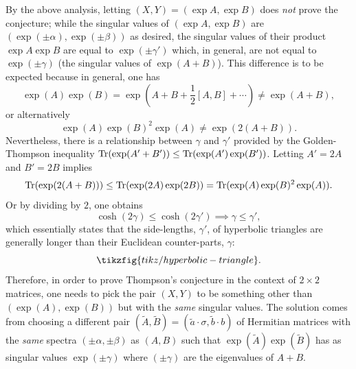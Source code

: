 \documentclass[notitlepage]{article}
\begin{document}
By the above analysis, letting $(X,Y) = (\exp A, \exp B)$ does \textit{not} prove the conjecture;
while the singular values of $(\exp A, \exp B)$ are $(\exp (\pm \alpha), \exp(\pm \beta))$ as desired, the singular values of their product $\exp A \exp B$ are equal to $\exp(\pm \gamma')$ which, in general, are not equal to $\exp(\pm \gamma)$ (the singular values of $\exp (A + B)$).
This difference is to be expected because in general, one has
\begin{equation}
    \exp(A)\exp(B) = \exp(A+B+\frac{1}{2}[A,B]+\cdots) \neq \exp(A+B),
\end{equation}
or alternatively
\begin{equation}
    \exp(A)\exp(B)^2\exp(A) \neq \exp(2(A+B)).
\end{equation}
Nevertheless, there is a relationship between $\gamma$ and $\gamma'$ provided by the Golden-Thompson inequality $\operatorname{Tr}(\exp(A'+B')) \leq \operatorname{Tr}(\exp(A')\exp(B'))$.
Letting $A'=2A$ and $B'=2B$ implies
\begin{equation}
    \operatorname{Tr}(\exp(2(A+B))) \leq \operatorname{Tr}(\exp(2A)\exp(2B)) = \operatorname{Tr}(\exp(A)\exp(B)^2\exp(A)).
\end{equation}
Or by dividing by $2$, one obtains
\begin{equation}
    \cosh(2\gamma) \leq \cosh(2 \gamma') \implies \gamma \leq \gamma',
\end{equation}
which essentially states that the side-lengths, $\gamma'$, of hyperbolic triangles are generally longer than their Euclidean counter-parts, $\gamma$:
\begin{equation}
    \tikzfig{tikz/hyperbolic-triangle}.
\end{equation}
Therefore, in order to prove Thompson's conjecture in the context of $2\times 2$ matrices, one needs to pick the pair $(X,Y)$ to be something other than $(\exp(A), \exp(B))$ but with the \textit{same} singular values.
The solution comes from choosing a different pair $(\tilde A, \tilde B) = (\tilde a \cdot \sigma, \tilde b \cdot b)$ of Hermitian matrices with the \textit{same} spectra $(\pm \alpha, \pm \beta)$ as $(A,B)$ such that $\exp(\tilde A)\exp(\tilde B)$ has as singular values $\exp(\pm \gamma)$ where $(\pm \gamma)$ are the eigenvalues of $A+B$.
\end{document}
